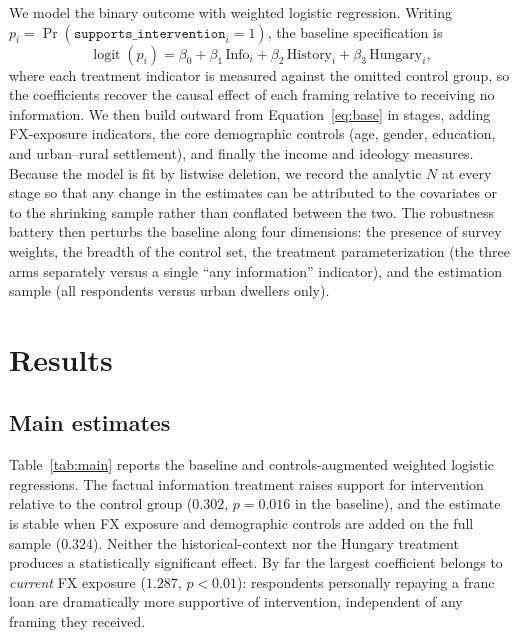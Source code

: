 \documentclass[11pt]{article}
\begin{document}
We model the binary outcome with weighted logistic regression. Writing
$p_i = \Pr(\texttt{supports\_intervention}_i = 1)$, the baseline specification is
\begin{equation}
\operatorname{logit}(p_i)
  = \beta_0
  + \beta_1 \,\text{Info}_i
  + \beta_2 \,\text{History}_i
  + \beta_3 \,\text{Hungary}_i ,
\label{eq:base}
\end{equation}
where each treatment indicator is measured against the omitted control group, so
the coefficients recover the causal effect of each framing relative to receiving
no information. We then build outward from Equation~\eqref{eq:base} in stages,
adding FX-exposure indicators, the core demographic controls (age, gender,
education, and urban--rural settlement), and finally the income and ideology
measures. Because the model is fit by listwise deletion, we record the analytic
$N$ at every stage so that any change in the estimates can be attributed to the
covariates or to the shrinking sample rather than conflated between the two. The
robustness battery then perturbs the baseline along four dimensions: the presence
of survey weights, the breadth of the control set, the treatment
parameterization (the three arms separately versus a single ``any information''
indicator), and the estimation sample (all respondents versus urban dwellers
only).

\section{Results}

\subsection{Main estimates}

Table~\ref{tab:main} reports the baseline and controls-augmented weighted
logistic regressions. The factual information treatment raises support for
intervention relative to the control group ($0.302$, $p=0.016$ in the baseline),
and the estimate is stable when FX exposure and demographic controls are added on
the full sample ($0.324$). Neither the historical-context nor the Hungary
treatment produces a statistically significant effect. By far the largest
coefficient belongs to \emph{current} FX exposure ($1.287$, $p<0.01$):
respondents personally repaying a franc loan are dramatically more supportive of
intervention, independent of any framing they received.

\begin{table}[H]
\centering
\caption{Logistic regression of support for government intervention (weighted).}
\label{tab:main}

\end{table}
\end{document}
